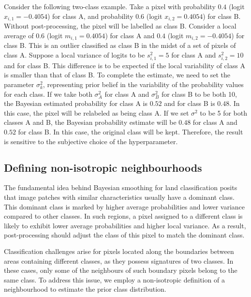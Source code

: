 \documentclass[
  shortnames]{jss}
\begin{document}
Consider the following two-class example. Take a pixel with probability \(0.4\) (logit \(x_{i,1} = -0.4054\)) for class A, and probability \(0.6\) (logit \(x_{i,2} = 0.4054\)) for class B. Without post-processing, the pixel will be labelled as class B. Consider a local average of \(0.6\) (logit \(m_{i,1} = 0.4054\)) for class A and \(0.4\) (logit \(m_{i,2} = -0.4054\)) for class B. This is an outlier classified as class B in the midst of a set of pixels of class A. Suppose a local variance of logits to be \(s^2_{i,1} = 5\) for class A and \(s^2_{i,2} = 10\) and for class B. This difference is to be expected if the local variability of class A is smaller than that of class B. To complete the estimate, we need to set the parameter \(\sigma^2_{k}\), representing prior belief in the variability of the probability values for each class. If we take both \(\sigma^2_{A}\) for class A and \(\sigma^2_{B}\) for class B to be both 10, the Bayesian estimated probability for class A is \(0.52\) and for class B is \(0.48\). In this case, the pixel will be relabeled as being class A. If we set \(\sigma^2\) to be 5 for both classes A and B, the Bayesian probability estimate will be \(0.48\) for class A and \(0.52\) for class B. In this case, the original class will be kept. Therefore, the result is sensitive to the subjective choice of the hyperparameter.

\newpage

\hypertarget{defining-non-isotropic-neighbourhoods}{%
\subsection{Defining non-isotropic neighbourhoods}\label{defining-non-isotropic-neighbourhoods}}

The fundamental idea behind Bayesian smoothing for land classification posits that image patches with similar characteristics usually have a dominant class. This dominant class is marked by higher average probabilities and lower variance compared to other classes. In such regions, a pixel assigned to a different class is likely to exhibit lower average probabilities and higher local variance. As a result, post-processing should adjust the class of this pixel to match the dominant class.

Classification challenges arise for pixels located along the boundaries between areas containing different classes, as they possess signatures of two classes. In these cases, only some of the neighbours of such boundary pixels belong to the same class. To address this issue, we employ a non-isotropic definition of a neighbourhood to estimate the prior class distribution.
\end{document}
